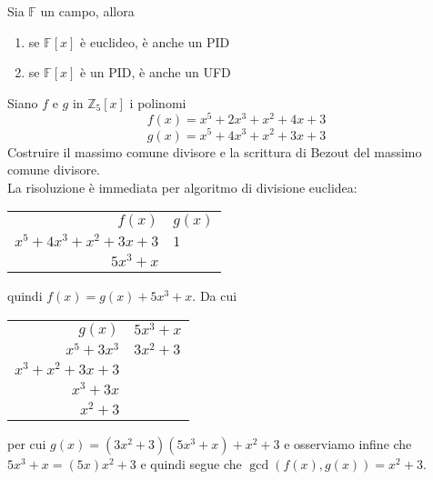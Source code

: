 \begin{teorema}
	Sia $\mathbb{F}$ un campo, allora 
	\begin{enumerate}
		\item se $\mathbb{F}[x]$ è euclideo, è anche un PID
		\item se $\mathbb{F}[x]$ è un PID, è anche un UFD
	\end{enumerate}
\end{teorema}

\begin{esercizio}
	Siano $f$ e $g$ in $\mathbb{Z}_5[x]$ i polinomi 
	\begin{equation*}
	f(x)=x^5+2x^3+x^2+4x+3
	\end{equation*}
	\begin{equation*}
	g(x)=x^5+4x^3+x^2+3x+3
	\end{equation*}
	Costruire il massimo comune divisore e la scrittura di Bezout del massimo comune divisore.\\
	
	La risoluzione è immediata per algoritmo di divisione euclidea:
	\begin{center}
		\begin{tabular}{r|r}
			$f(x)$ & \multicolumn{1}{l}{$g(x)$}  \\ 
			\cline{2-2}
			$x^5+4x^3+x^2+3x+3$      & \multicolumn{1}{l}{$1$}    \\ 
			\cline{1-1}
			$5x^3+x$    &                              
		\end{tabular}
	\end{center}
	quindi $f(x) = g(x) + 5x^3+x$. Da cui 
	\begin{center}
		\begin{tabular}{r|r}
			$g(x)$ & \multicolumn{1}{l}{$5x^3+x$}  \\ 
			\cline{2-2}
			$x^5+3x^3$      & \multicolumn{1}{l}{$3x^2+3$}    \\ 
			\cline{1-1}
			$x^3+x^2+3x+3$    &  \\
			$x^3+3x$ & \\
			\cline{1-1} 
			$x^2+3$ &                      
		\end{tabular}
	\end{center}
	per cui $g(x) = (3x^2+3)(5x^3+x) + x^2+3$ e osserviamo infine che $5x^3+x = (5x)x^2+3$ 
	e quindi segue che $\gcd(f(x),g(x)) = x^2+3$.\\
	

\end{esercizio}
